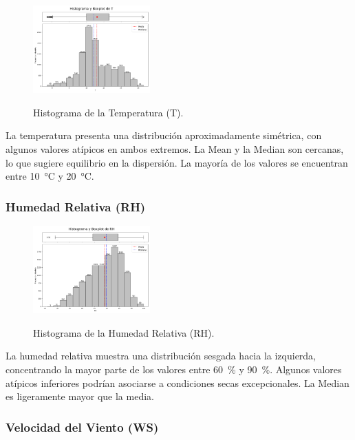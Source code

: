 \begin{figure}[H]
    \caption{Histograma de la Temperatura (T).}
    \centering
    \includegraphics[width=0.4\textwidth]{resultados/global/univariado/T_histograma.png}
    \label{fig:T_histograma}
\end{figure}

La temperatura presenta una distribución aproximadamente simétrica, con algunos valores atípicos en ambos extremos. La Mean y la Median son cercanas, lo que sugiere equilibrio en la dispersión. La mayoría de los valores se encuentran entre \SI{10}{\degreeCelsius} y \SI{20}{\degreeCelsius}.

\newpage

\subsubsection*{Humedad Relativa (RH)}

\begin{figure}[H]
    \caption{Histograma de la Humedad Relativa (RH).}
    \centering
    \includegraphics[width=0.4\textwidth]{resultados/global/univariado/RH_histograma.png}
    \label{fig:RH_histograma}
\end{figure}

La humedad relativa muestra una distribución sesgada hacia la izquierda, concentrando la mayor parte de los valores entre \SI{60}{\percent} y \SI{90}{\percent}. Algunos valores atípicos inferiores podrían asociarse a condiciones secas excepcionales. La Median es ligeramente mayor que la media.

\vspace{2em}

\subsubsection*{Velocidad del Viento (WS)}

